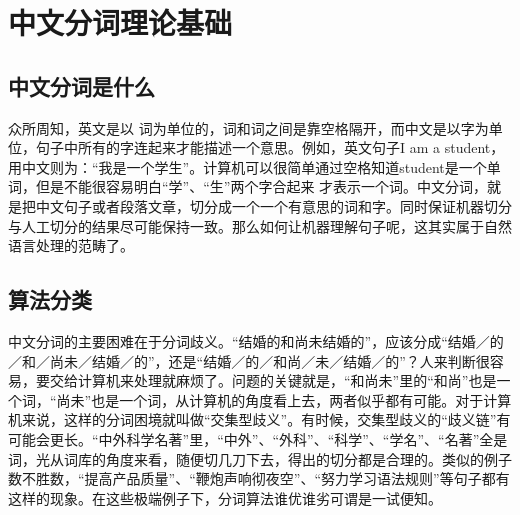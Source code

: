 \documentclass[bachelor,winfonts]{jnuthesis}
\begin{document}
\section{中文分词理论基础}
\subsection{中文分词是什么}
众所周知，英文是以 词为单位的，词和词之间是靠空格隔开，而中文是以字为单位，句子中所有的字连起来才能描述一个意思。例如，英文句子I am a student，用中文则为：“我是一个学生”。计算机可以很简单通过空格知道student是一个单词，但是不能很容易明白“学”、“生”两个字合起来 才表示一个词。中文分词，就是把中文句子或者段落文章，切分成一个一个有意思的词和字。同时保证机器切分与人工切分的结果尽可能保持一致。那么如何让机器理解句子呢，这其实属于自然语言处理\cite{时鸿涛2009基于自然语言的语义推理接口}的范畴了。

\subsection{算法分类}
中文分词的主要困难在于分词歧义\cite{matrix-blog}。“结婚的和尚未结婚的”，应该分成“结婚／的／和／尚未／结婚／的”，还是“结婚／的／和尚／未／结婚／的”？人来判断很容易，要交给计算机来处理就麻烦了。问题的关键就是，“和尚未”里的“和尚”也是一个词，“尚未”也是一个词，从计算机的角度看上去，两者似乎都有可能。对于计算机来说，这样的分词困境就叫做“交集型歧义”。有时候，交集型歧义的“歧义链”有可能会更长。“中外科学名著”里，“中外”、“外科”、“科学”、“学名”、“名著”全是词，光从词库的角度来看，随便切几刀下去，得出的切分都是合理的。类似的例子数不胜数，“提高产品质量”、“鞭炮声响彻夜空”、“努力学习语法规则”等句子都有这样的现象。在这些极端例子下，分词算法谁优谁劣可谓是一试便知。
\end{document}
